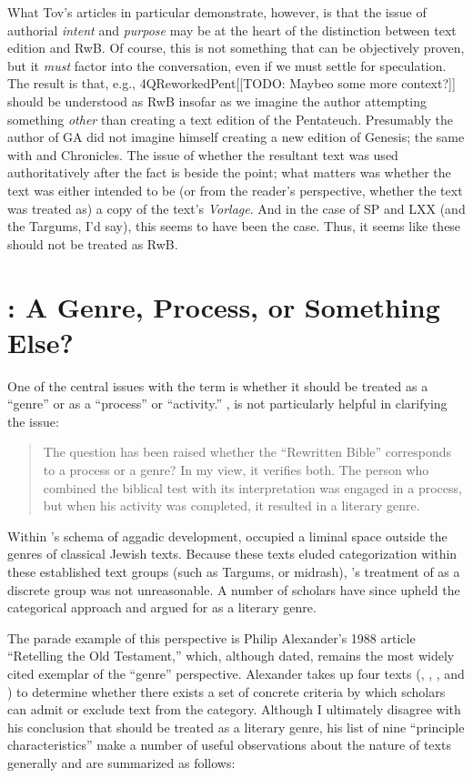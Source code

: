 What Tov's articles in particular demonstrate, however, is that the issue of authorial \emph{intent} and \emph{purpose} may be at the heart of the distinction between text edition and RwB. Of course, this is not something that can be objectively proven, but it \emph{must} factor into the conversation, even if we must settle for speculation. The result is that, e.g., 4QReworkedPent[[TODO: Maybeo some more context?]] should be understood as RwB insofar as we imagine the author attempting something \emph{other} than creating a text edition of the Pentateuch. Presumably the author of GA did not imagine himself creating a new edition of Genesis; the same with \jub and Chronicles. The issue of whether the resultant text was used authoritatively after the fact is beside the point; what matters was whether the text was either intended to be (or from the reader's perspective, whether the text was treated as) a copy of the text's \emph{Vorlage}. And in the case of SP and LXX (and the Targums, I'd say), this seems to have been the case. Thus, it seems like these should not be treated as RwB. 

\section{\RWB: A Genre, Process, or Something Else?}

 One of the central issues with the term \RwB is whether it should be treated as a ``genre'' or as a ``process'' or ``activity.'' \vermes, is not particularly helpful in clarifying the issue: 

\begin{quote}
    The question has been raised whether the ``Rewritten Bible'' corresponds to a process or a genre? In my view, it verifies both. The person who combined the biblical test with its interpretation was engaged in a process, but when his activity was completed, it resulted in a literary genre.\autocite[8]{vermes_zsengeller2014}
\end{quote} 

Within \vermes's schema of aggadic development, \rwb occupied a liminal space outside the genres of classical Jewish texts. Because these texts eluded categorization within these established text groups (such as Targums, or midrash), \vermes's treatment of \rwb as a discrete group was not unreasonable. A number of scholars have since upheld the categorical approach and argued for \rwb as a literary genre. 

The parade example of this perspective is Philip Alexander's 1988 article ``Retelling the Old Testament,'' which, although dated, remains the most widely cited exemplar of the ``genre'' perspective.\autocites{alexander_carson-williamson1988}[\vermes himself even put his stamp of approval on it, see][4]{vermes_zsengeller2014} Alexander takes up four \rwB texts (\jub, \ga, \lab, and \ant) to determine whether there exists a set of concrete criteria by which scholars can admit or exclude text from the category. Although I ultimately disagree with his conclusion that \rwb should be treated as a literary genre, his list of nine ``principle characteristics'' make a number of useful observations about the nature of \rwb texts generally and are summarized as follows: 

